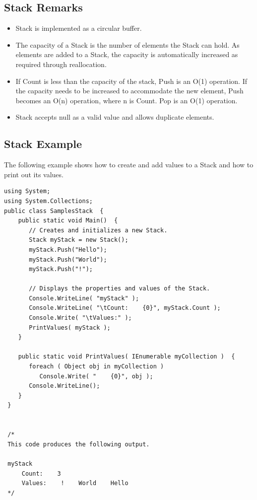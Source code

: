 \documentclass[12pt,a4paper,final,twoside,titlepage]{book}
\begin{document}
\subsection{Stack Remarks}
\begin{itemize}
\item Stack is implemented as a circular buffer.
\item The capacity of a Stack is the number of elements the Stack can hold. As elements are added to a Stack, the capacity is automatically increased as required through reallocation.
\item If Count is less than the capacity of the stack, Push is an O(1) operation. If the capacity needs to be increased to accommodate the new element, Push becomes an O(n) operation, where n is Count. Pop is an O(1) operation.
\item Stack accepts null as a valid value and allows duplicate elements.
\end{itemize}
\subsection{Stack Example}
The following example shows how to create and add values to a Stack and how to print out its values.
\begin{lstlisting}
using System;
using System.Collections;
public class SamplesStack  {
    public static void Main()  {
       // Creates and initializes a new Stack.
       Stack myStack = new Stack();
       myStack.Push("Hello");
       myStack.Push("World");
       myStack.Push("!");

       // Displays the properties and values of the Stack.
       Console.WriteLine( "myStack" );
       Console.WriteLine( "\tCount:    {0}", myStack.Count );
       Console.Write( "\tValues:" );
       PrintValues( myStack );
    }

    public static void PrintValues( IEnumerable myCollection )  {
       foreach ( Object obj in myCollection )
          Console.Write( "    {0}", obj );
       Console.WriteLine();
    }
 }


 /* 
 This code produces the following output.

 myStack
     Count:    3
     Values:    !    World    Hello
 */
\end{lstlisting}
\end{document}
